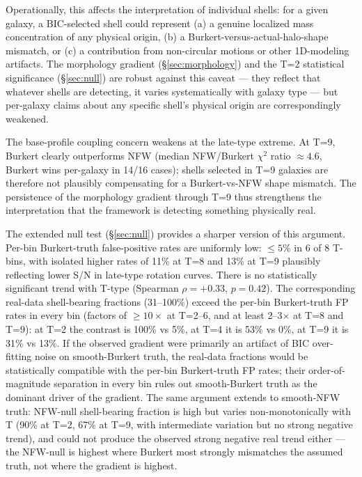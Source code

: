 Operationally, this affects the interpretation of individual shells: for a given galaxy, a BIC-selected shell could represent (a) a genuine localized mass concentration of any physical origin, (b) a Burkert-versus-actual-halo-shape mismatch, or (c) a contribution from non-circular motions or other 1D-modeling artifacts. The morphology gradient (\S\ref{sec:morphology}) and the T=2 statistical significance (\S\ref{sec:null}) are robust against this caveat --- they reflect that whatever shells are detecting, it varies systematically with galaxy type --- but per-galaxy claims about any specific shell's physical origin are correspondingly weakened.

The base-profile coupling concern weakens at the late-type extreme. At T=9, Burkert clearly outperforms NFW (median NFW/Burkert $\chi^2$ ratio $\approx 4.6$, Burkert wins per-galaxy in 14/16 cases); shells selected in T=9 galaxies are therefore not plausibly compensating for a Burkert-vs-NFW shape mismatch. The persistence of the morphology gradient through T=9 thus strengthens the interpretation that the framework is detecting something physically real.

The extended null test (\S\ref{sec:null}) provides a sharper version of this argument. Per-bin Burkert-truth false-positive rates are uniformly low: $\leq 5\%$ in 6 of 8 T-bins, with isolated higher rates of 11\% at T=8 and 13\% at T=9 plausibly reflecting lower S/N in late-type rotation curves. There is no statistically significant trend with T-type (Spearman $\rho = +0.33$, $p = 0.42$). The corresponding real-data shell-bearing fractions (31--100\%) exceed the per-bin Burkert-truth FP rates in every bin (factors of $\geq 10\times$ at T=2--6, and at least 2--3$\times$ at T=8 and T=9): at T=2 the contrast is 100\% vs 5\%, at T=4 it is 53\% vs 0\%, at T=9 it is 31\% vs 13\%. If the observed gradient were primarily an artifact of BIC over-fitting noise on smooth-Burkert truth, the real-data fractions would be statistically compatible with the per-bin Burkert-truth FP rates; their order-of-magnitude separation in every bin rules out smooth-Burkert truth as the dominant driver of the gradient. The same argument extends to smooth-NFW truth: NFW-null shell-bearing fraction is high but varies non-monotonically with T (90\% at T=2, 67\% at T=9, with intermediate variation but no strong negative trend), and could not produce the observed strong negative real trend either --- the NFW-null is highest where Burkert most strongly mismatches the assumed truth, not where the gradient is highest.


